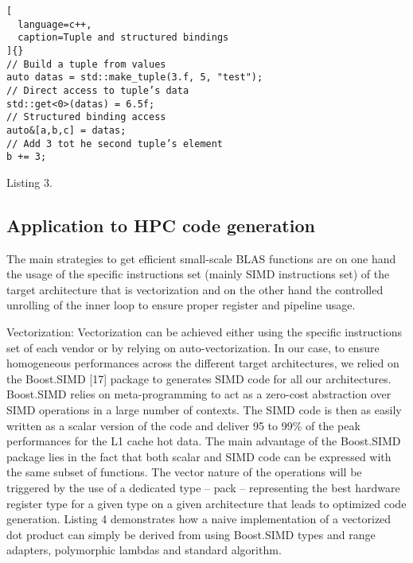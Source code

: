 \documentclass[../../main.tex]{subfiles}
\begin{document}
\begin{itemize}
\begin{lstlisting}[
  language=c++,
  caption=Tuple and structured bindings
]{}
// Build a tuple from values
auto datas = std::make_tuple(3.f, 5, "test");
// Direct access to tuple’s data
std::get<0>(datas) = 6.5f;
// Structured binding access
auto&[a,b,c] = datas;
// Add 3 tot he second tuple’s element
b += 3;
\end{lstlisting}
Listing 3.

\end{itemize}

\subsection{Application to HPC code generation}

The main strategies to get efficient small-scale BLAS
functions are on one hand the usage of the specific
instructions set (mainly SIMD instructions set) of the target
architecture that is vectorization and on the other hand the
controlled unrolling of the inner loop to ensure proper register
and pipeline usage.

\item Vectorization: Vectorization can be achieved either
using the specific instructions set of each vendor or
by relying on auto-vectorization. In our case, to ensure
homogeneous performances across the different target
architectures, we relied on the Boost.SIMD [17] package
to generates SIMD code for all our architectures.
Boost.SIMD relies on \cpp meta-programming to act as
a zero-cost abstraction over SIMD operations in a large
number of contexts. The SIMD code is then as easily
written as a scalar version of the code and deliver 95%
to 99\% of the peak performances for the L1 cache hot
data. The main advantage of the Boost.SIMD package
lies in the fact that both scalar and SIMD code can
be expressed with the same subset of functions. The
vector nature of the operations will be triggered by
the use of a dedicated type – pack – representing the
best hardware register type for a given type on a given
architecture that leads to optimized code generation.
Listing 4 demonstrates how a naive implementation of a
vectorized dot product can simply be derived from using
Boost.SIMD types and range adapters, polymorphic
lambdas and standard algorithm.
\end{document}
